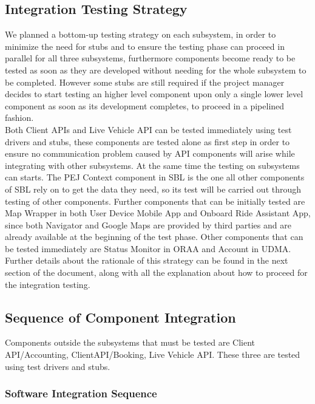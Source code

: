\subsection{Integration Testing Strategy}
We planned a bottom-up testing strategy on each subsystem, in order to minimize the need for stubs and to ensure the testing phase can proceed in parallel for all three subsystems, furthermore components become ready to be tested as soon as they are developed without needing for the whole subsystem to be completed. However some stubs are still required if the project manager decides to start testing an higher level component upon only a single lower level component as soon as its development completes, to proceed in a pipelined fashion.\\
Both Client APIs and Live Vehicle API can be tested immediately using test drivers and stubs, these components are tested alone as first step in order to ensure no communication problem caused by API components will arise while integrating with other subsystems. At the same time the testing on subsystems can starts. The PEJ Context component in SBL is the one all other components of SBL rely on to get the data they need, so its test will be carried out through testing of other components. Further components that can be initially tested are Map Wrapper in both User Device Mobile App and Onboard Ride Assistant App, since both Navigator and Google Maps are provided by third parties and are already available at the beginning of the test phase. Other components that can be tested immediately are Status Monitor in ORAA and Account in UDMA.\\
Further details about the rationale of this strategy can be found in the next section of the document, along with all the explanation about how to proceed for the integration testing.


\subsection{Sequence of Component Integration}
Components outside the subsystems that must be tested are Client API/Accounting, ClientAPI/Booking, Live Vehicle API. These three are tested using test drivers and stubs.


\subsubsection{Software Integration Sequence}

